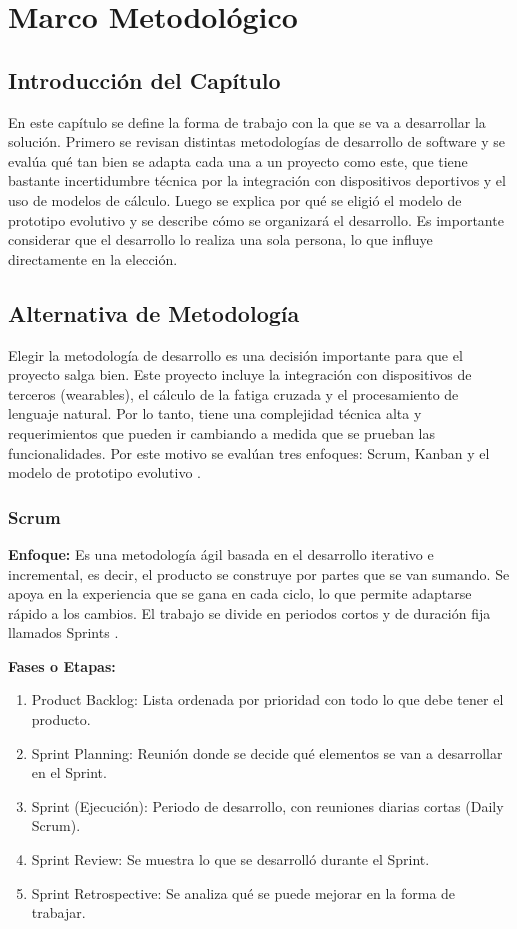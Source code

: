 \section{Marco Metodológico}
\subsection{Introducción del Capítulo}

En este capítulo se define la forma de trabajo con la que se va a desarrollar la solución. Primero se revisan distintas metodologías de desarrollo de software y se evalúa qué tan bien se adapta cada una a un proyecto como este, que tiene bastante incertidumbre técnica por la integración con dispositivos deportivos y el uso de modelos de cálculo. Luego se explica por qué se eligió el modelo de prototipo evolutivo y se describe cómo se organizará el desarrollo. Es importante considerar que el desarrollo lo realiza una sola persona, lo que influye directamente en la elección.
\subsection{Alternativa de Metodología}

Elegir la metodología de desarrollo es una decisión importante para que el proyecto salga bien. Este proyecto incluye la integración con dispositivos de terceros (wearables), el cálculo de la fatiga cruzada y el procesamiento de lenguaje natural. Por lo tanto, tiene una complejidad técnica alta y requerimientos que pueden ir cambiando a medida que se prueban las funcionalidades. Por este motivo se evalúan tres enfoques: Scrum, Kanban y el modelo de prototipo evolutivo \citep{sommerville2015, pressman2010}.
\newpage
\subsubsection{Scrum}
\textbf{Enfoque:} Es una metodología ágil basada en el desarrollo iterativo e incremental, es decir, el producto se construye por partes que se van sumando. Se apoya en la experiencia que se gana en cada ciclo, lo que permite adaptarse rápido a los cambios. El trabajo se divide en periodos cortos y de duración fija llamados Sprints \citep{schwaber2020scrum}.

\textbf{Fases o Etapas:}
\begin{enumerate}
    \item Product Backlog: Lista ordenada por prioridad con todo lo que debe tener el producto.
    \item Sprint Planning: Reunión donde se decide qué elementos se van a desarrollar en el Sprint.
    \item Sprint (Ejecución): Periodo de desarrollo, con reuniones diarias cortas (Daily Scrum).
    \item Sprint Review: Se muestra lo que se desarrolló durante el Sprint.
    \item Sprint Retrospective: Se analiza qué se puede mejorar en la forma de trabajar.
\end{enumerate}

